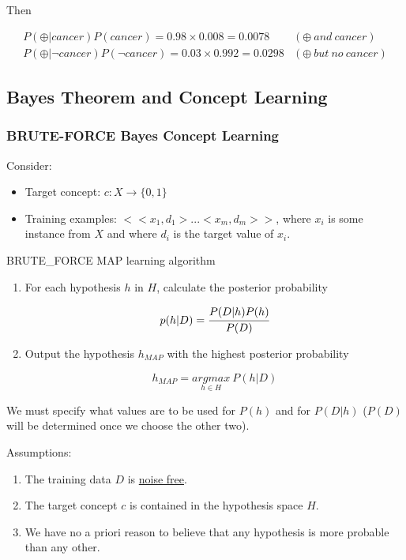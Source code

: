 Then

\begin{equation*}
\begin{aligned}
P(\oplus |cancer)P(cancer)=0.98\times0.008=0.0078&(\oplus\ and\ cancer)\\
P(\oplus|\neg cancer)P(\neg cancer)=0.03\times0.992=0.0298&(\oplus\ but\ no\ cancer)
\end{aligned}
\end{equation*}

\hypertarget{bayes-theorem-and-concept-learning}{%
\subsection{Bayes Theorem and Concept
Learning}\label{bayes-theorem-and-concept-learning}}

\hypertarget{brute-force-bayes-concept-learning}{%
\subsubsection{BRUTE-FORCE Bayes Concept
Learning}\label{brute-force-bayes-concept-learning}}

Consider:

\begin{itemize}
\item
  Target concept: \(c:X\rightarrow\{0,1\}\)
\item
  Training examples: \(<<x_1,d_1>...<x_m,d_m>>\), where \(x_i\) is some
  instance from \(X\) and where \(d_i\) is the target value of \(x_i\).
\end{itemize}

BRUTE\_FORCE MAP learning algorithm

\begin{enumerate}
\def\labelenumi{\arabic{enumi}.}
\item
  For each hypothesis \(h\) in \(H\), calculate the posterior
  probability

  \[p(h|D)=\cfrac{P(D|h)P(h)}{P(D)}\]
\item
  Output the hypothesis \(h_{MAP}\) with the highest posterior
  probability

  \[h_{MAP}=\underset{h\in H}{argmax}\ P(h|D)\]
\end{enumerate}

We must specify what values are to be used for \(P(h)\) and for
\(P(D|h)\) (\(P(D)\) will be determined once we choose the other two).

Assumptions:

\begin{enumerate}
\def\labelenumi{\arabic{enumi}.}
\item
  The training data \(D\) is \underline{noise free}.
\item
  The target concept \(c\) is contained in the hypothesis space \(H\).
\item
  We have no a priori reason to believe that any hypothesis is more
  probable than any other.
\end{enumerate}

